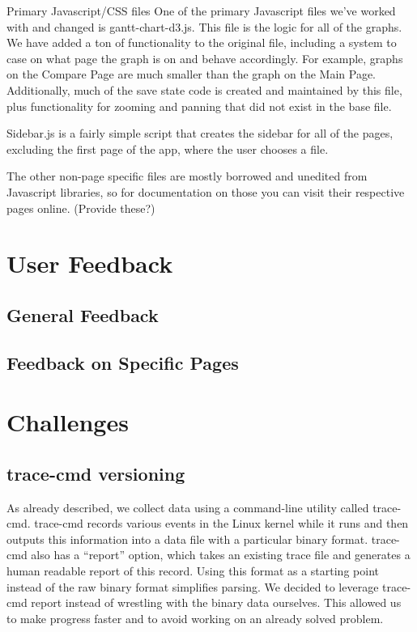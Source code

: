 \documentclass[midyear]{hmcclinic}
\begin{document}
  Primary Javascript/CSS files
  One of the primary Javascript files we’ve worked with and changed is gantt-chart-d3.js. This file is the logic for all of the graphs. We have added a ton of functionality to the original file, including a system to case on what page the graph is on and behave accordingly. For example, graphs on the Compare Page are much smaller than the graph on the Main Page. Additionally, much of the save state code is created and maintained by this file, plus functionality for zooming and panning that did not exist in the base file.

  Sidebar.js is a fairly simple script that creates the sidebar for all of the pages, excluding the first page of the app, where the user chooses a file.

  The other non-page specific files are mostly borrowed and unedited from Javascript libraries, so for documentation on those you can visit their respective pages online. (Provide these?)


\section{User Feedback} %
\subsection{General Feedback} %
\subsection{Feedback on Specific Pages} %

\section{Challenges}
\subsection{trace-cmd versioning} %
  As already described, we collect data using a command-line utility called
  trace-cmd. trace-cmd records various events in the Linux kernel while it runs
  and then outputs this information into a data file with a particular binary
  format. trace-cmd also has a ``report'' option, which takes an existing trace
  file and generates a human readable report of this record. Using this format
  as a starting point instead of the raw binary format simplifies parsing.
  We decided to leverage trace-cmd report instead of wrestling with the binary
  data ourselves. This allowed us to make progress faster and to avoid working
  on an already solved problem.
\end{document}

